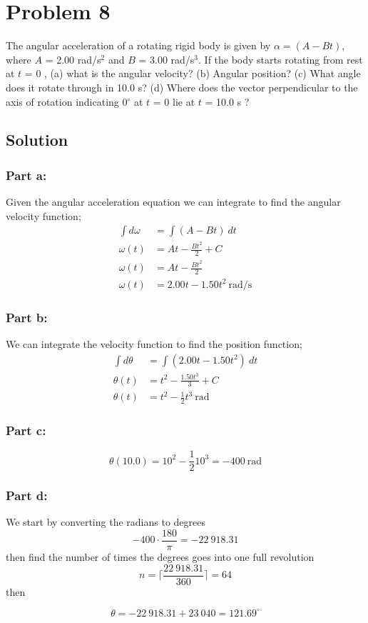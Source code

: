 \documentclass{article}
\begin{document}
\section*{Problem 8}
The angular acceleration of a rotating rigid body is given by $\alpha = (A-Bt)$, where $A$ =
2.00 rad/s$^2$ and $B$ = 3.00 rad/s$^3$. If the body starts rotating from rest at $t$ = 0 , (a) what is the angular
velocity? (b) Angular position? (c) What angle does it rotate through in 10.0 s? (d) Where does
the vector perpendicular to the axis of rotation indicating 0$^\circ$ at $t$ = 0 lie at $t$ = 10.0 s ?

\subsection*{Solution}
\subsubsection*{Part a:}
Given the angular acceleration equation we can integrate to find the angular velocity function;
\begin{align*}
	\int d\omega &= \int (A - Bt) \ dt \\
	\omega(t) &= At - \frac{Bt^2}{2} + C \\
	\omega(t) &= At - \frac{Bt^2}{2}\\
	\omega(t) &= 2.00t - 1.50 t^2\ \text{rad}/\text{s}
\end{align*}

\subsubsection*{Part b:}
We can integrate the velocity function to find the position function;
\begin{align*}
	\int d\theta &= \int (2.00t - 1.50t^2) \ dt \\
	\theta(t) &= t^2 - \frac{1.50 t^3}{3} + C \\
	\theta(t) &= t^2 - \frac{1}{2}t^3 \ \text{rad}
\end{align*}

\subsubsection*{Part c:}
\[
	\theta(10.0) = 10^2 - \frac{1}{2}10^3 = \boxed{-400\ \text{rad}}
\]

\subsubsection*{Part d:}
We start by converting the radians to degrees
\[
	-400 \cdot \frac{180}{\pi} = -22\ 918.31
\]
then find the number of times the degrees goes into one full revolution
\[
	n = \Biggr\lceil \frac{22\ 918.31}{360} \Biggr\rceil = 64
\]
then

\[
	\theta = -22\ 918.31 + 23\ 040 = \boxed{121.69^\circ}
\]
\end{document}
